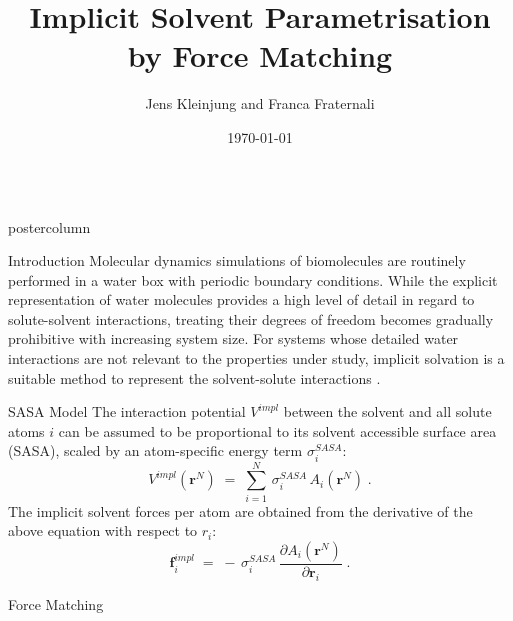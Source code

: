 \documentclass{beamer}
\title{\huge Implicit Solvent Parametrisation by Force Matching}
\author{Jens Kleinjung and Franca Fraternali}
\institute[]{The Francis Crick Institute, King's College London}
\date{\today}
\newcommand{\sig}{$\sigma_i^{SASA}$}
\newlength{\columnheight}
\begin{document}
\begin{frame}
\begin{columns}
\begin{column}{.45\textwidth}
\begin{beamercolorbox}[center]{postercolumn}
\begin{minipage}{.98\textwidth}  %
\parbox[t][\columnheight]{\textwidth}{ %
\begin{myblock}{Introduction}
Molecular dynamics simulations of biomolecules are routinely performed in
a water box with periodic boundary conditions. While the explicit representation
of water molecules provides a high level of detail in regard to solute-solvent
interactions, treating their degrees of freedom becomes gradually prohibitive
with increasing system size. For systems whose detailed water interactions are
not relevant to the properties under study, implicit solvation is a suitable
method to represent the solvent-solute interactions \cite{Kleinjung_2014}.
\end{myblock}\vfill
\begin{myblock}{SASA Model}
The interaction potential $V^{impl}$ between the solvent and all solute
atoms $i$ can be assumed to be proportional to its solvent accessible
surface area (SASA), scaled by an atom-specific energy term \sig:
\begin{equation}
\label{eq:sasapot}
V^{impl}(\mathbf{r}^N) \; = \; \sum_{i=1}^{N} \, \sigma_i^{SASA} \, A_i(\mathbf{r}^N) \; .
\end{equation}
The implicit solvent forces per atom are obtained from the derivative of the above
equation with respect to $r_i$:
\begin{equation}
\label{eq:Fimpl}
\mathbf{f}_i^{impl} \; = \; - \, \sigma_i^{SASA} \, \frac{\partial A_i(\mathbf{r}^N)}{\partial \mathbf{r}_i} \; .
\end{equation}
\end{myblock}\vfill
\begin{myblock}{Force Matching}
\begin{figure}
\begin{minipage}{0.45\textwidth}

\end{minipage}
\end{figure}
\end{myblock}}
\end{minipage}
\end{beamercolorbox}
\end{column}
\end{columns}
\end{frame}
\end{document}
